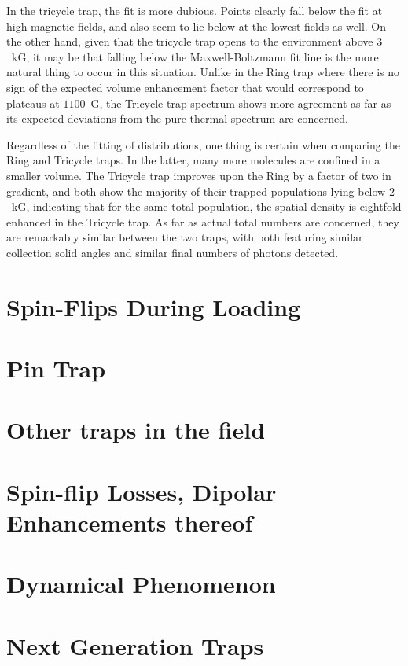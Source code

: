 \documentclass[defaultstyle,11pt]{thesis}
\begin{document}
In the tricycle trap, the fit is more dubious. 
Points clearly fall below the fit at high magnetic fields, and also seem to lie below at the lowest fields as well.
On the other hand, given that the tricycle trap opens to the environment above $3$~kG, it may be that falling below the Maxwell-Boltzmann fit line is the more natural thing to occur in this situation.
Unlike in the Ring trap where there is no sign of the expected volume enhancement factor that would correspond to plateaus at $1100$~G, the Tricycle trap spectrum shows more agreement as far as its expected deviations from the pure thermal spectrum are concerned.

Regardless of the fitting of distributions, one thing is certain when comparing the Ring and Tricycle traps.
In the latter, many more molecules are confined in a smaller volume.
The Tricycle trap improves upon the Ring by a factor of two in gradient, and both show the majority of their trapped populations lying below $2$~kG, indicating that for the same total population, the spatial density is eightfold enhanced in the Tricycle trap.
As far as actual total numbers are concerned, they are remarkably similar between the two traps, with both featuring similar collection solid angles and similar final numbers of photons detected.

\subsection{}


\section{Spin-Flips During Loading}
\label{loadingtransitions}

\section{Pin Trap}

\section{Other traps in the field}

\section{Spin-flip Losses, Dipolar Enhancements thereof}

\section{Dynamical Phenomenon}

\section{Next Generation Traps}



\end{document}
